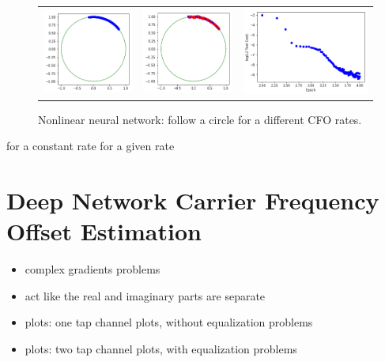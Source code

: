 \setlength{\tabcolsep}{0pt}
\begin{figure}
  \centering
  \caption{Nonlinear neural network: follow a circle for a different CFO rates.}
  \begin{tabular}{ccc}
    \includegraphics[width=50mm]{figures/follow_circle_nonlinear_before.png}&
    \includegraphics[width=50mm]{figures/follow_circle_nonlinear_after.png}&
    \includegraphics[width=70mm]{figures/follow_circle_nonlinear_loss.png}\\
  \end{tabular}
  \label{fig:circle_diff_rate}
\end{figure}

for a constant rate
for a given rate


\section{Deep Network Carrier Frequency Offset Estimation}
\begin{itemize}
\item complex gradients problems
\item act like the real and imaginary parts are separate
\item plots: one tap channel plots, without equalization problems
\item plots: two tap channel plots, with equalization problems
\end{itemize}


